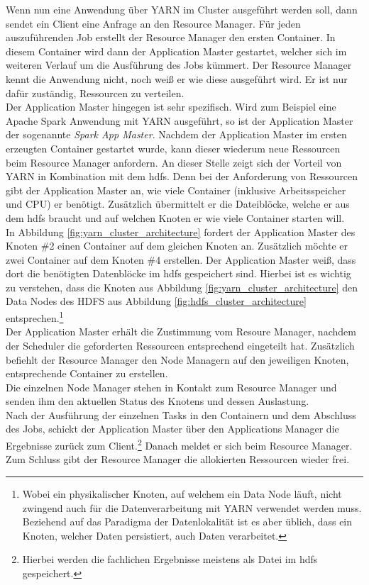 \noindent
Wenn nun eine Anwendung über YARN im Cluster ausgeführt werden soll, dann sendet ein Client eine Anfrage an den Resource Manager. 
Für jeden auszuführenden Job erstellt der Resource Manager den ersten Container. In diesem Container wird dann der Application Master gestartet, welcher sich im weiteren Verlauf um die Ausführung des Jobs kümmert. Der Resource Manager kennt die Anwendung nicht, noch weiß er wie diese ausgeführt wird. 
Er ist nur dafür zuständig, Ressourcen zu verteilen.\\ 
Der Application Master hingegen ist sehr spezifisch. Wird zum Beispiel eine Apache Spark Anwendung mit YARN ausgeführt, so ist der Application Master der sogenannte \textit{Spark App Master}. Nachdem der Application Master im ersten erzeugten Container gestartet wurde, kann dieser wiederum neue Ressourcen beim Resource Manager anfordern. 
An dieser Stelle zeigt sich der Vorteil von YARN in Kombination mit dem \gls{hdfs}. Denn bei der Anforderung von Ressourcen gibt der Application Master an, wie viele Container (inklusive Arbeitsspeicher und CPU) er benötigt. Zusätzlich übermittelt er die Dateiblöcke, welche er aus dem \gls{hdfs} braucht und auf welchen Knoten er wie viele Container starten will.\\ 
In Abbildung \ref{fig:yarn_cluster_architecture} fordert der Application Master des Knoten \#2 einen Container auf dem gleichen Knoten an. Zusätzlich möchte er zwei Container auf dem Knoten \#4 erstellen. Der Application Master weiß, dass dort die benötigten Datenblöcke im \gls{hdfs} gespeichert sind. Hierbei ist es wichtig zu verstehen, dass die Knoten aus Abbildung \ref{fig:yarn_cluster_architecture} den Data Nodes des HDFS aus Abbildung \ref{fig:hdfs_cluster_architecture} entsprechen.\footnote{Wobei ein physikalischer Knoten, auf welchem ein Data Node läuft, nicht zwingend auch für die Datenverarbeitung mit YARN verwendet werden muss. Beziehend auf das Paradigma der Datenlokalität ist es aber üblich, dass ein Knoten, welcher Daten persistiert, auch Daten verarbeitet.}\cite[S. 48-57]{expert_hadoop_admin}\\
Der Application Master erhält die Zustimmung vom Resoure Manager, nachdem der Scheduler die geforderten Ressourcen entsprechend eingeteilt hat. Zusätzlich befiehlt der Resource Manager den Node Managern auf den jeweiligen Knoten, entsprechende Container zu erstellen.\\
Die einzelnen Node Manager stehen in Kontakt zum Resource Manager und senden ihm den aktuellen Status des Knotens und dessen Auslastung. \\
Nach der Ausführung der einzelnen Tasks in den Containern und dem Abschluss des Jobs, schickt der Application Master über den Applications Manager die Ergebnisse zurück zum Client.\footnote{Hierbei werden die fachlichen Ergebnisse meistens als Datei im \gls{hdfs} gespeichert.} Danach meldet er sich beim Resource Manager. Zum Schluss gibt der Resource Manager die allokierten Ressourcen wieder frei.\\


